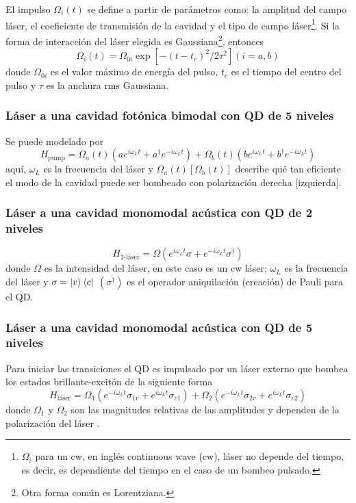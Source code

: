 \documentclass[../main.tex]{subfiles}
\begin{document}
El impulso $\Omega_i(t)$ se define a partir de parámetros como: la amplitud del campo láser, el coeficiente de transmisión de la cavidad y el tipo de campo láser\footnote{$\Omega_i$ para un cw, en inglés continuous wave (cw), láser no depende del tiempo, es decir, es dependiente del tiempo en el caso de un bombeo pulsado.}. Si la forma de interacción del láser elegida es Gaussiana\footnote{Otra forma común es Lorentziana.}, entonces
\begin{equation}
	\Omega_i(t) = \Omega_{0i}\exp[-(t-t_c)^2/2\tau^2] (i=a,b)
\end{equation}
donde $\Omega_{0i}$ es el valor máximo de energía del pulso, $t_c$ es el tiempo del centro del pulso y $\tau$ es la anchura rms Gaussiana.

\subsubsection{Láser a una cavidad fotónica bimodal con QD de 5 niveles}
Se puede modelado por
\begin{equation}\label{eq:H_pump}
	H_\text{pump} = \Omega_a (t) (ae^{i\omega_L t} + a^\dagger e^{-i\omega_L t}) + \Omega_b (t) (be^{i\omega_L t} + b^\dagger e^{-i\omega_L t})
\end{equation}
aquí, $\omega_L$ es la frecuencia del láser y $\Omega_a(t)[\Omega_b(t)]$ describe qué tan eficiente el modo de la cavidad puede ser bombeado con polarización derecha [izquierda].

\subsubsection{Láser a una cavidad monomodal acústica con QD de 2 niveles}
\begin{equation}
	H_\text{2-láser} = \Omega(e^{i\omega_L t} \sigma + e^{-i\omega_L t} \sigma^\dagger)
\end{equation}
donde $\Omega$ es la intensidad del láser, en este caso es un cw láser; $\omega_L$ es la frecuencia del láser y 
$\sigma = \ket{v}\bra{c}$  $(\sigma^\dagger)$ es el operador aniquilación (creación) de Pauli para el QD.

\subsubsection{Láser a una cavidad monomodal acústica con QD de 5 niveles}
Para iniciar las transiciones el QD es impulsado por un láser externo que bombea los estados brillante-excitón de la siguiente forma
\begin{equation}\label{eq:5-laser}
	H_\text{láser} = \Omega_1 (e^{-i\omega_L t}\sigma_{1v} + e^{i\omega_L t}\sigma_{v1}) + \Omega_2 (e^{-i\omega_L t}\sigma_{2v} + e^{i\omega_L t}\sigma_{v2})
\end{equation}
donde $\Omega_1$ y $\Omega_2$ son las magnitudes relativas de las amplitudes y dependen de la polarización del láser \parencite{Belhadj2009}.
\end{document}
